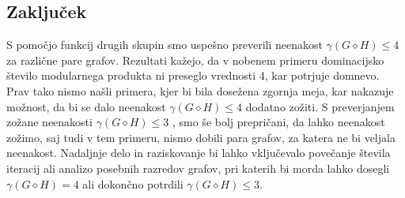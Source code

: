 \documentclass[a4paper,12pt]{article}
\theoremstyle{definition}
\begin{document}
\subsection{Zaključek}
S pomočjo funkcij drugih skupin smo uspešno preverili neenakost $\gamma(G \diamond H) \leq 4$ za različne pare grafov. Rezultati kažejo, da v nobenem primeru dominacijsko število modularnega produkta ni preseglo vrednosti 4, kar potrjuje domnevo. Prav tako nismo našli primera, kjer bi bila dosežena zgornja meja, kar nakazuje možnost, da bi se dalo neenakost $\gamma(G \diamond H) \leq 4$  dodatno zožiti. S preverjanjem zožane neenakosti $\gamma(G \diamond H) \leq 3$ , smo še bolj prepričani, da lahko neenakost zožimo, saj tudi v tem primeru, nismo dobili para grafov, za katera ne bi veljala neenakost. Nadaljnje delo in raziskovanje bi lahko vključevalo povečanje števila iteracij ali analizo posebnih razredov grafov, pri katerih bi morda lahko dosegli $\gamma(G \diamond H) = 4$ ali dokončno potrdili $\gamma(G \diamond H) \leq 3$.


    
%
%
\end{document}
